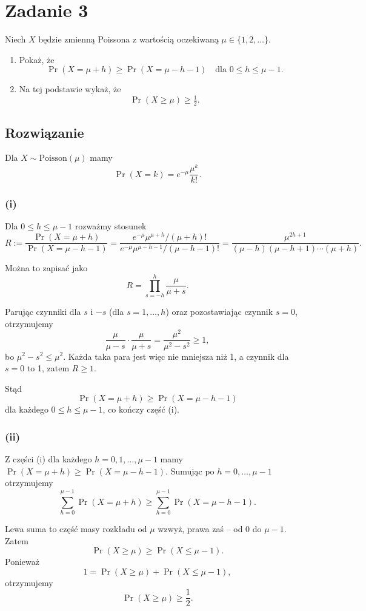 \section{Zadanie 3}
Niech \( X \) będzie zmienną Poissona z wartością oczekiwaną \( \mu \in \{1,2,\ldots\} \).

\begin{enumerate}
	\item[(i)] Pokaż, że
	      \[
		      \Pr(X=\mu+h) \ge \Pr(X=\mu-h-1) \quad \text{dla } 0\le h\le \mu-1.
	      \]

	\item[(ii)] Na tej podstawie wykaż, że
	      \[
		      \Pr(X\ge \mu) \ge \tfrac{1}{2}.
	      \]
\end{enumerate}
\subsection*{Rozwiązanie}

Dla \( X\sim\mathrm{Poisson}(\mu) \) mamy
\[
	\Pr(X=k)=e^{-\mu}\frac{\mu^k}{k!}.
\]

\subsubsection*{(i)}
Dla \(0\le h\le\mu-1\) rozważmy stosunek
\[
	R:=\frac{\Pr(X=\mu+h)}{\Pr(X=\mu-h-1)}
	=\frac{e^{-\mu}\mu^{\mu+h}/(\mu+h)!}{e^{-\mu}\mu^{\mu-h-1}/(\mu-h-1)!}
	=\frac{\mu^{2h+1}}{(\mu-h)(\mu-h+1)\cdots(\mu+h)}.
\]

Można to zapisać jako
\[
	R=\prod_{s=-h}^{h}\frac{\mu}{\mu+s}.
\]

Parując czynniki dla \(s\) i \(-s\) (dla \(s=1,\dots,h\)) oraz pozostawiając czynnik \(s=0\), otrzymujemy
\[
	\frac{\mu}{\mu-s}\cdot\frac{\mu}{\mu+s}=\frac{\mu^2}{\mu^2-s^2}\ge1,
\]
bo \(\mu^2-s^2\le\mu^2\). Każda taka para jest więc nie mniejsza niż 1, a czynnik dla \(s=0\) to 1, zatem \(R\ge1\).

Stąd
\[
	\Pr(X=\mu+h)\ge\Pr(X=\mu-h-1)
\]
dla każdego \(0\le h\le\mu-1\), co kończy część (i).

\subsubsection*{(ii)}
Z części (i) dla każdego \(h=0,1,\dots,\mu-1\) mamy
\(\Pr(X=\mu+h)\ge\Pr(X=\mu-h-1)\). Sumując po \(h=0,\dots,\mu-1\) otrzymujemy
\[
	\sum_{h=0}^{\mu-1}\Pr(X=\mu+h)\ge\sum_{h=0}^{\mu-1}\Pr(X=\mu-h-1).
\]

Lewa suma to część masy rozkładu od \(\mu\) wzwyż, prawa zaś – od 0 do \(\mu-1\). Zatem
\[
	\Pr(X\ge\mu)\ge\Pr(X\le\mu-1).
\]
Ponieważ
\[
	1=\Pr(X\ge\mu)+\Pr(X\le\mu-1),
\]
otrzymujemy
\[
	\Pr(X\ge\mu)\ge\frac12.
\]
